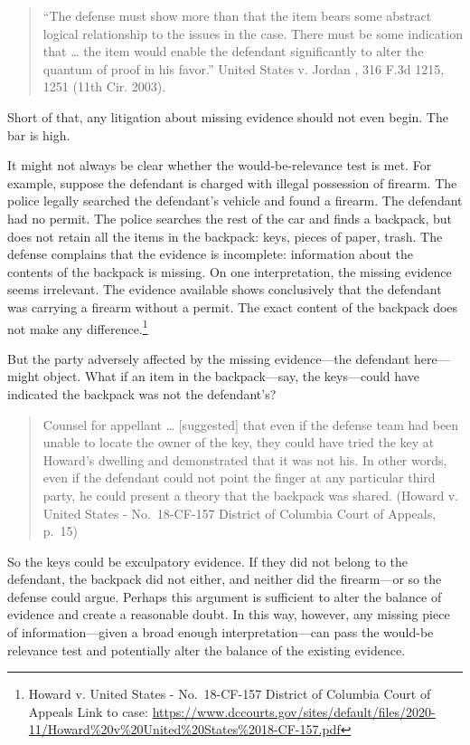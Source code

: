 \documentclass[
  10pt,
  dvipsnames,enabledeprecatedfontcommands]{scrartcl}
\begin{document}
\begin{quote}
``The defense must show more than that the item bears some abstract
logical relationship to the issues in the case. There must be some
indication that \ldots{} the item would enable the defendant
significantly to alter the quantum of proof in his favor.'' United
States v. Jordan , 316 F.3d 1215, 1251 (11th Cir. 2003).
\end{quote}

\noindent Short of that, any litigation about missing evidence should
not even begin. The bar is high.

It might not always be clear whether the would-be-relevance test is met.
For example, suppose the defendant is charged with illegal possession of
firearm. The police legally searched the defendant's vehicle and found a
firearm. The defendant had no permit. The police searches the rest of
the car and finds a backpack, but does not retain all the items in the
backpack: keys, pieces of paper, trash. The defense complains that the
evidence is incomplete: information about the contents of the backpack
is missing. On one interpretation, the missing evidence seems
irrelevant. The evidence available shows conclusively that the defendant
was carrying a firearm without a permit. The exact content of the
backpack does not make any difference.\footnote{Howard v. United States
  - No.~18-CF-157 District of Columbia Court of Appeals Link to case:
  \url{https://www.dccourts.gov/sites/default/files/2020-11/Howard\%20v\%20United\%20States\%2018-CF-157.pdf}}

But the party adversely affected by the missing evidence---the defendant
here---might object. What if an item in the backpack---say, the
keys---could have indicated the backpack was not the defendant's?

\begin{quote}
Counsel for appellant \ldots{} {[}suggested{]} that even if the defense
team had been unable to locate the owner of the key, they could have
tried the key at Howard's dwelling and demonstrated that it was not his.
In other words, even if the defendant could not point the finger at any
particular third party, he could present a theory that the backpack was
shared. (Howard v. United States - No.~18-CF-157 District of Columbia
Court of Appeals, p.~15)
\end{quote}

\noindent So the keys could be exculpatory evidence. If they did not
belong to the defendant, the backpack did not either, and neither did
the firearm---or so the defense could argue. Perhaps this argument is
sufficient to alter the balance of evidence and create a reasonable
doubt. In this way, however, any missing piece of information---given a
broad enough interpretation---can pass the would-be relevance test and
potentially alter the balance of the existing evidence.
\end{document}
